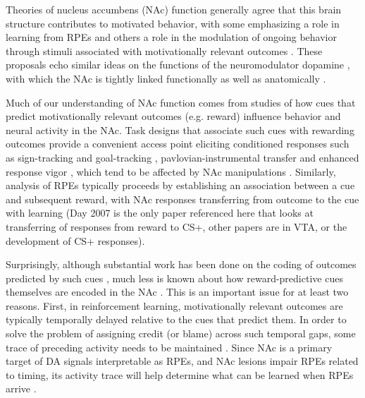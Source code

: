 \documentclass[11pt]{article}
\let\cite=\citep
\begin{document}
Theories of nucleus accumbens (NAc) function generally agree that this brain
structure contributes to motivated behavior, with some emphasizing a role in
learning from RPEs \cite{Averbeck2017,Joel2002,Khamassi2012,Lee2012,Maia2009,Schultz2016}\cite[see also the addiction literature on effects of drug rewards;][]{Carelli2009,Hyman2006,Kalivas2005} and others a role in the modulation of ongoing behavior through stimuli associated with motivationally relevant outcomes \cite[invigorating, directing;][]{Floresco2015,Nicola2010a,Salamone2012}. These proposals echo similar ideas on the functions of the neuromodulator dopamine \cite{Berridge2012,Maia2009,Salamone2012,Schultz2016}, with which the NAc is tightly linked functionally as well as anatomically \cite{Cheer2007,DuHoffmann2014,Ikemoto2007,Takahashi2016}.

Much of our understanding of NAc function comes from studies of how cues that
predict motivationally relevant outcomes (e.g. reward) influence behavior and
neural activity in the NAc. Task designs that associate such cues with rewarding
outcomes provide a convenient access point eliciting conditioned responses such
as sign-tracking and goal-tracking \cite{hearst1974sign,Robinson2009}, pavlovian-instrumental transfer \cite{Estes1943,Rescorla1967} and enhanced
response vigor \cite{Nicola2010a,Niv2007}, which tend to be affected by NAc
manipulations \cite{Chang2012,Corbit2011,Flagel2011} \cite[although not always
straightforwardly (is Hauber appropriate?);][]{Chang2013,Hauber2000}. Similarly, analysis of RPEs typically proceeds by establishing an association between a cue and subsequent reward, with NAc responses transferring from outcome to the cue with learning \cite{Day2007a,Roitman2005,Setlow2003,Schultz1997}(Day 2007 is the only paper referenced here that looks at transferring of responses from reward to CS+, other papers are in VTA, or the development of CS+ responses).

Surprisingly, although substantial work has been done on the coding of outcomes predicted by such cues \cite{Atallah2014,Bissonette2013,Cooch2015,Day2006,Goldstein2012,Hollerman1998,Lansink2012,McGinty2013,Nicola2004,Roesch2009a,Roitman2005,Saddoris2011,Setlow2003,Sugam2014,West2016}, much less is known about how reward-predictive cues themselves are encoded in the NAc \cite{Sleezer2016}. This is an important issue for at least two reasons. First, in reinforcement learning, motivationally relevant outcomes are typically temporally delayed relative to the cues that predict them. In order to solve the problem of assigning credit (or blame) across such temporal gaps, some trace of preceding activity needs to be maintained \cite{Lee2012,sutton1998}. Since NAc is a primary target of DA signals interpretable as RPEs, and NAc lesions impair RPEs related to timing, its activity trace will help determine what can be learned when RPEs arrive \cite{Hamid2016,Hart2014,Ikemoto2007,McDannald2011,Takahashi2016}.
\end{document}
